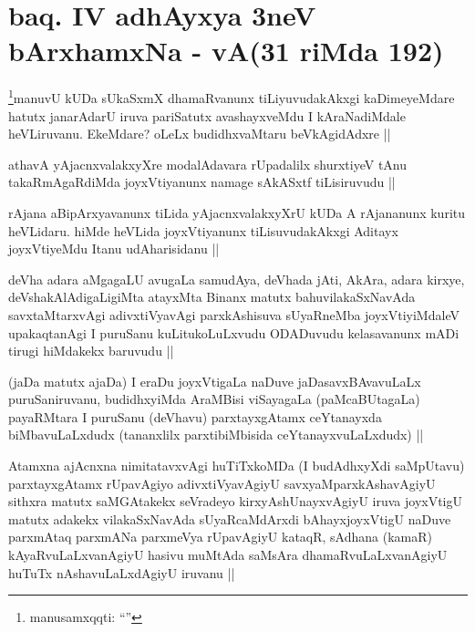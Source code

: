 \section*{baq. {\rm IV} adhAyxya 3neV bArxhamxNa - vA(31 riMda 192)}


\begin{artha}
\footnote{manusamxqqti: ``\stext''}manuvU kUDa sUkaSxmX dhamaRvanunx tiLiyuvudakAkxgi kaDimeyeMdare hatutx janarAdarU iruva pariSatutx avashayxveMdu I kAraNadiMdale heVLiruvanu. EkeMdare? oLeLx budidhxvaMtaru beVkAgidAdxre ||
\end{artha}

\begin{artha}
athavA yAjacnxvalakxyXre modalAdavara rUpadalilx shurxtiyeV tAnu takaRmAgaRdiMda joyxVtiyanunx namage sAkASxtf tiLisiruvudu ||
\end{artha}

\begin{artha}
rAjana aBipArxyavanunx tiLida yAjacnxvalakxyXrU kUDa A rAjananunx kuritu heVLidaru. hiMde heVLida joyxVtiyanunx tiLisuvudakAkxgi Aditayx joyxVtiyeMdu Itanu udAharisidanu ||
\end{artha}

\begin{artha}
deVha adara aMgagaLU avugaLa samudAya, deVhada jAti, AkAra, adara kirxye, deVshakAlAdigaLigiMta atayxMta Binanx matutx bahuvilakaSxNavAda savxtaMtarxvAgi adivxtiVyavAgi parxkAshisuva sUyaRneMba joyxVtiyiMdaleV upakaqtanAgi I puruSanu kuLitukoLuLxvudu ODADuvudu kelasavanunx mADi tirugi hiMdakekx baruvudu ||
\end{artha}

\begin{artha}
(jaDa matutx ajaDa) I eraDu joyxVtigaLa naDuve jaDasavxBAvavuLaLx puruSaniruvanu, budidhxyiMda AraMBisi viSayagaLa (paMcaBUtagaLa) payaRMtara I puruSanu (deVhavu) parxtayxgAtamx ceYtanayxda biMbavuLaLxdudx (tananxlilx parxtibiMbisida ceYtanayxvuLaLxdudx) ||
\end{artha}

\begin{artha}
Atamxna ajAcnxna nimitatavxvAgi huTiTxkoMDa (I budAdhxyXdi saMpUtavu) parxtayxgAtamx rUpavAgiyo adivxtiVyavAgiyU savxyaMparxkAshavAgiyU sithxra matutx saMGAtakekx seVradeyo kirxyAshUnayxvAgiyU iruva joyxVtigU matutx adakekx vilakaSxNavAda sUyaRcaMdArxdi bAhayxjoyxVtigU naDuve parxmAtaq parxmANa parxmeVya rUpavAgiyU kataqR, sAdhana (kamaR) kAyaRvuLaLxvanAgiyU hasivu muMtAda saMsAra dhamaRvuLaLxvanAgiyU huTuTx nAshavuLaLxdAgiyU iruvanu ||
\end{artha}

